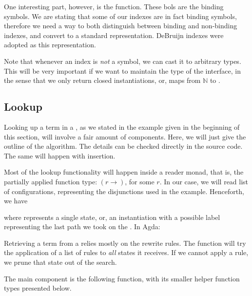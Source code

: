 
One interesting part, however, is the  function. These bols are the binding
symbols. We are stating that some of our indexes are in fact binding symbols, therefore
we need a way to both distinguish between binding and non-binding indexes, and convert
to a standard representation. DeBruijn indexes were adopted as this representation.


Note that whenever an index is \emph{not} a symbol, we can cast it to arbitrary types.
This will be very important if we want to maintain the type of the interface, in the sense
that we only return closed instantiations, or, maps from $\mathbb{N}$ to . 

\subsection{Lookup}

Looking up a term in a \mytrie, as we stated in the example given in the beginning of this section,
will involve a fair amount of components. Here, we will just give the outline of the algorithm. The
details can be checked directly in the source code. The same will happen with insertion.

Most of the lookup functionality will happen inside a reader monad, that is, the partially applied function type: $(r \rightarrow)$, for some $r$. In our case, we will read list of configurations,
representing the disjunctions used in the example. Henceforth, we have


where  represents a single state, or, an instantiation with a possible label
representing the last path we took on the \mytrie. In Agda:


Retrieving a term from a \mytrie relies mostly on the rewrite rules. The  function
will try the application of a list of rules to \emph{all} states it receives. If we cannot apply a rule,
we prune that state out of the search.


The main component is the following function, with its smaller helper function types presented
below.

\\
\\

